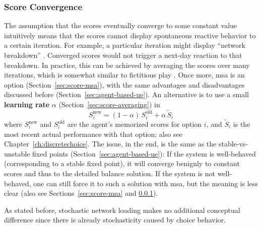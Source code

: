\subsubsection{Score Convergence}
\label{sec:score-convergence}

The assumption that the scores
eventually converge to
some constant value intuitively means that the scores cannot display
spontaneous reactive behavior to a certain iteration.  For example,
a particular iteration might display  ``network
breakdown'' \citep{RieserNagel2008NetworkBreakdown}.  Converged scores
would not trigger a next-day reaction to that breakdown.  In practice,
this can be achieved by averaging the scores over many iterations,
which is somewhat similar to fictitious play 
\citep{monderer-1996, garcia-2000}.
Once more, \gls{msa} is an option (Section~\ref{sec:score-msa}), with the same advantages and
disadvantages discussed before (Section~\ref{sec:agent-based-ue}). 
An alternative is to use a small
\textbf{learning rate} $\alpha$ (Section~\ref{sec:score-averaging}) in
\begin{equation}
S_i^\text{new} = (1-\alpha) \, S_i^\text{old} + \alpha \, \tilde S_i
\end{equation}
where $S_i^\text{new}$ and $S_i^\text{old}$ are the agent's memorized scores for
option $i$, and $\tilde S_i$ is the most recent actual performance
with that option; also see Chapter~\ref{ch:discretechoice}.  
%
The issue, in the end, is the same as the
stable-vs-unstable fixed points (\cf Section~\ref{sec:agent-based-ue}):
If the system is well-behaved (corresponding to a stable fixed point),
it will converge benignly to constant scores and thus to the detailed
balance solution.  If the system is not well-behaved, one can still
force it to such a solution with \gls{msa}, but the meaning is less
clear (also see Sections~\ref{sec:score-msa} and \ref{sec:score-convergence}).

As stated before, stochastic network loading makes no additional
conceptual difference\corr{,}{} since there is already stochasticity caused by
choice behavior.



